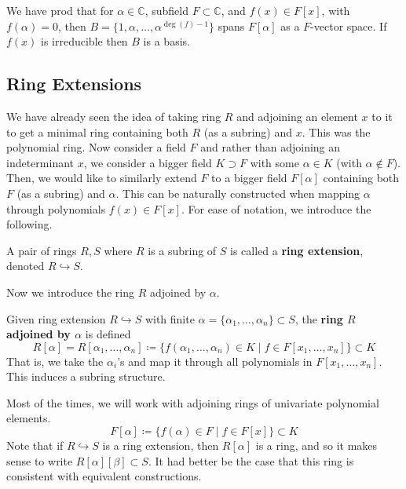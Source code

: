   We have prod that for $\alpha \in \mathbb{C}$, subfield $F \subset \mathbb{C}$, and $f(x) \in F[x]$, with $f(\alpha) = 0$, then $B = \{1, \alpha, \ldots, \alpha^{\deg(f) - 1}\}$ spans $F[\alpha]$ as a $F$-vector space. If $f(x)$ is irreducible then $B$ is a basis. 

\subsection{Ring Extensions} 

  We have already seen the idea of taking ring $R$ and adjoining an element $x$ to it to get a minimal ring containing both $R$ (as a subring) and $x$. This was the polynomial ring. Now consider a field $F$ and rather than adjoining an indeterminant $x$, we consider a bigger field $K \supset F$ with some $\alpha \in K$ (with $\alpha \not\in F$). Then, we would like to similarly extend $F$ to a bigger field $F[\alpha]$ containing both $F$ (as a subring) and $\alpha$. This can be naturally constructed when mapping $\alpha$ through polynomials $f(x) \in F[x]$. For ease of notation, we introduce the following. 

  \begin{definition}
    A pair of rings $R, S$ where $R$ is a subring of $S$ is called a \textbf{ring extension}, denoted $R \hookrightarrow S$. 
  \end{definition}

  Now we introduce the ring $R$ adjoined by $\alpha$. 
  
  \begin{definition} 
    Given ring extension $R \hookrightarrow S$ with finite $\alpha = \{\alpha_1, \ldots, \alpha_n\} \subset S$, the \textbf{ring $R$ adjoined by $\alpha$} is defined 
    \begin{equation}
      R[\alpha] = R[\alpha_1, \ldots, \alpha_n] \coloneqq \{ f(\alpha_1, \ldots, \alpha_n) \in K \mid f \in F[x_1, \ldots, x_n]\} \subset K
    \end{equation} 
    That is, we take the $\alpha_i$'s and map it through all polynomials in $F[x_1, \ldots, x_n]$. This induces a subring structure. 
  \end{definition} 

  Most of the times, we will work with adjoining rings of univariate polynomial elements. 
  \begin{equation}
    F[\alpha] \coloneqq \{ f(\alpha) \in F \mid f \in F[x]\} \subset K
  \end{equation} 
  Note that if $R \hookrightarrow S$ is a ring extension, then $R[\alpha]$ is a ring, and so it makes sense to write $R[\alpha][\beta] \subset S$. It had better be the case that this ring is consistent with equivalent constructions. 

